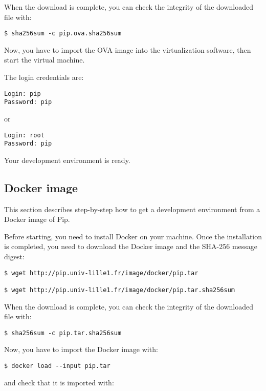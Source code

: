 \documentclass[10pt,a4paper,titlepage]{refart}
\begin{document}
When the download is complete, you can check the integrity of the downloaded
file with:

\begin{lstlisting}[style=BashStyle]
$ sha256sum -c pip.ova.sha256sum
\end{lstlisting}

Now, you have to import the OVA image into the virtualization software, then
start the virtual machine.

The login credentials are:

\begin{lstlisting}
Login: pip
Password: pip
\end{lstlisting}

or

\begin{lstlisting}
Login: root
Password: pip
\end{lstlisting}

Your development environment is ready.

\subsection{Docker image}

This section describes step-by-step how to get a development environment from a
Docker image of Pip.

Before starting, you need to install Docker on your machine. Once the
installation is completed, you need to download the Docker image and the SHA-256
message digest:

\begin{lstlisting}[style=BashStyle]
$ wget http://pip.univ-lille1.fr/image/docker/pip.tar

$ wget http://pip.univ-lille1.fr/image/docker/pip.tar.sha256sum
\end{lstlisting}

When the download is complete, you can check the integrity of the downloaded
file with:

\begin{lstlisting}[style=BashStyle]
$ sha256sum -c pip.tar.sha256sum
\end{lstlisting}

Now, you have to import the Docker image with:

\begin{lstlisting}[style=BashStyle]
$ docker load --input pip.tar
\end{lstlisting}

and check that it is imported with:
\end{document}
